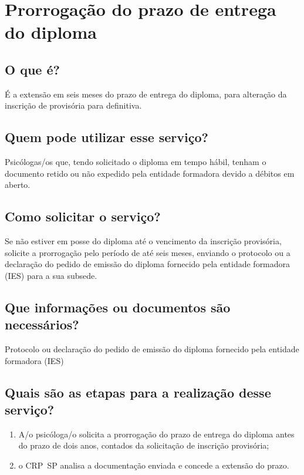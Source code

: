 \chapter{Prorrogação do prazo de entrega do diploma}
\label{chap:pf-prorroga_diploma}

\section{O que é?}

É a extensão em seis meses do prazo de entrega do diploma, para alteração da inscrição de provisória para definitiva.

\section{Quem pode utilizar esse serviço?}

Psicólogas/os que, tendo solicitado o diploma em tempo hábil, tenham o documento retido ou não expedido pela entidade formadora devido a
débitos em aberto.

\section{Como solicitar o serviço?}

Se não estiver em posse do diploma até o vencimento da inscrição provisória, solicite a prorrogação pelo período de até seis meses,
enviando o protocolo ou a declaração do pedido de emissão do diploma fornecido pela entidade formadora (IES) para a sua subsede.

\section{Que informações ou documentos são necessários?}

Protocolo ou declaração do pedido de emissão do diploma fornecido pela entidade formadora (IES)

\section{Quais são as etapas para a realização desse serviço?}

\begin{enumerate}
	\item
	A/o psicóloga/o solicita a prorrogação do prazo de entrega do diploma
	antes do prazo de dois anos, contados da solicitação de inscrição
	provisória;
	\item
	o CRP~SP analisa a documentação enviada e concede a extensão do prazo.
\end{enumerate}

